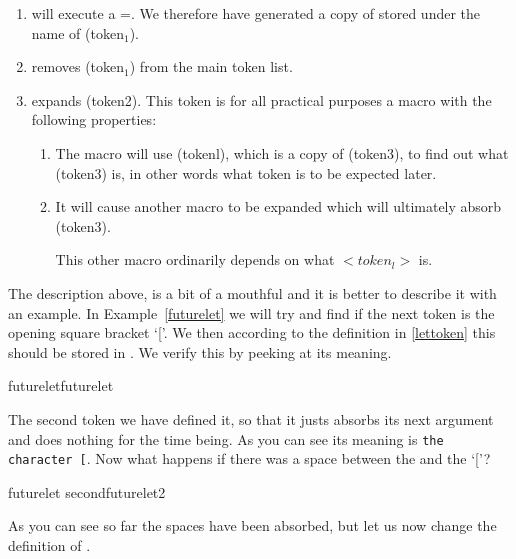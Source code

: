 \begin{enumerate}
\item  \tex will execute a \cmd{\let}=.
We therefore have generated a copy of 
stored under the name of (token$_1$).\label{lettoken}

\item  removes (token$_1$) from the main token list.

\item \tex expands (token2). This token is for all
practical purposes a macro with the following
properties:

\begin{enumerate}
\item The macro will use (tokenl), which is a
copy of (token3), to find out what (token3)
is, in other words what token is to be
expected later.
\item It will cause another macro to be expanded
which will ultimately absorb (token3).

This other macro ordinarily depends on
what $<token_l>$ is.
\end{enumerate}
\end{enumerate}

The description above, is a bit of a mouthful and it is better to describe it with an example. In Example~\ref{futurelet} we will try and find if the next token is the opening square bracket `['. We then according to the definition in \ref{lettoken} this should be stored in . We verify this by peeking at its meaning.

\begin{texexample}{futurelet}{futurelet}
\def\tokentwo[#1]{}
\futurelet\tokenone\tokentwo[1]
\meaning\tokenone
\end{texexample}

The second token  we have defined it, so that it justs absorbs its next argument and does nothing for the time being. As you can see its meaning is \texttt{the character [}. Now what happens if there was a space between the  and the `['?

\begin{texexample}{futurelet second}{futurelet2}
\def\tokentwo#1{}
\futurelet\tokenone\tokentwo     [
\meaning\tokenone
\end{texexample}

As you can see so far the spaces have been absorbed, but let us now change the definition of .

